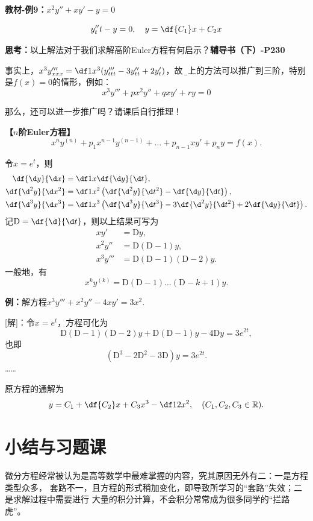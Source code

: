 {\bf 教材-例9：}$x^2y''+xy'-y=0$

$$y''_tt-y=0,\quad y=\df{C_1}x+C_2x$$

{\bf 思考：}以上解法对于我们求解高阶Euler方程有何启示？\hfill{\bf 辅导书（下）-P230}

事实上，$x^3y'''_{xxx}=\df1{x^3}(y'''_{ttt}-3y''_{tt}+2y'_t)$，故
{\b 以上的方法可以推广到三阶}，特别是$f(x)=0$的情形，例如：
$$x^3y'''+px^2y''+qxy'+ry=0$$

那么，还可以进一步推广吗？请课后自行推理！

\begin{shaded}
	{\bf 【$n$阶Euler方程】}
	$$x^ny^{(n)}+p_1x^{n-1}y^{(n-1)}+\ldots+p_{n-1}xy'
	+p_ny=f(x).$$
	
	令$x=e^t$，则
	\begin{align*}
		\df{\d y}{\d x}&=\df1x\df{\d y}{\d t},\\
		\df{\d^2 y}{\d x^2}&=\df1{x^2}\left(\df{\d^2 y}{\d t^2}
		-\df{\d y}{\d t}\right),\\
		\df{\d^3 y}{\d x^3}&=\df1{x^3}\left(\df{\d^3 y}{\d t^3}
		-3\df{\d^2 y}{\d t^2}+2\df{\d y}{\d t}\right).
	\end{align*}
	记$\mathrm{D}=\df{\d}{\d t}$，则以上结果可写为
	\begin{align*}
		xy'&=\mathrm{D}y,\\
		x^2y''&=\mathrm{D}(\mathrm{D}-1)y,\\
		x^3y'''&=\mathrm{D}(\mathrm{D}-1)(\mathrm{D}-2)y.
	\end{align*}
	一般地，有
	$$x^ky^{(k)}=\mathrm{D}(\mathrm{D}-1)\ldots(\mathrm{D}-k+1)y.$$
	
	{\bf 例：}解方程$x^3y'''+x^2y''-4xy'=3x^2$.
	
	[解]：令$x=e^t$，方程可化为
	$$\mathrm{D}(\mathrm{D}-1)(\mathrm{D}-2)y+\mathrm{D}(\mathrm{D}-1)y
	-4\mathrm{D}y=3e^{2t},$$
	也即
	$$(\mathrm{D}^3-2\mathrm{D}^2-3\mathrm{D})y=3e^{2t}.$$
	\ldots\ldots
	
	原方程的通解为
	$$y=C_1+\df{C_2}x+C_3x^3-\df12x^2,\quad(C_1,C_2,C_3\in\mathbb{R}).$$
\end{shaded}

\section{小结与习题课}

微分方程经常被认为是高等数学中最难掌握的内容，究其原因无外有二：一是方程类型众多，
套路不一，且方程的形式稍加变化，即导致所学习的“套路”失效；二是求解过程中需要进行
大量的积分计算，不会积分常常成为很多同学的“拦路虎”。

